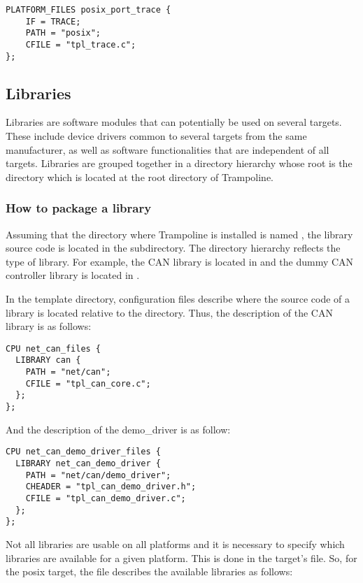 \begin{lstlisting}[language=OIL]
PLATFORM_FILES posix_port_trace {
    IF = TRACE;
    PATH = "posix";
    CFILE = "tpl_trace.c";
};
\end{lstlisting}


\subsection{Libraries}
\label{sec:libraries}

Libraries are software modules that can potentially be used on several targets. These include device drivers common to several targets from the same manufacturer, as well as software functionalities that are independent of all targets.
Libraries are grouped together in a directory hierarchy whose root is the  directory which is located at the root directory of Trampoline.

\subsubsection{How to package a library}

Assuming that the directory where Trampoline is installed is named , the library source code is located in the  subdirectory. The directory hierarchy reflects the type of library. For example, the CAN library is located in  and the dummy CAN controller library is located in .

In the template directory, configuration files describe where the source code of a library is located relative to the  directory. Thus, the description of the CAN library is as follows:

\begin{lstlisting}[language=OIL]
CPU net_can_files {
  LIBRARY can {
    PATH = "net/can";
    CFILE = "tpl_can_core.c";
  };
};
\end{lstlisting} 

And the description of the demo_driver is as follow:

\begin{lstlisting}[language=OIL]
CPU net_can_demo_driver_files {
  LIBRARY net_can_demo_driver {
    PATH = "net/can/demo_driver";
    CHEADER = "tpl_can_demo_driver.h";
    CFILE = "tpl_can_demo_driver.c";
  };
};
\end{lstlisting} 

Not all libraries are usable on all platforms and it is necessary to specify which libraries are available for a given platform. This is done in the target's  file. So, for the posix target, the  file describes the available libraries as follows:


